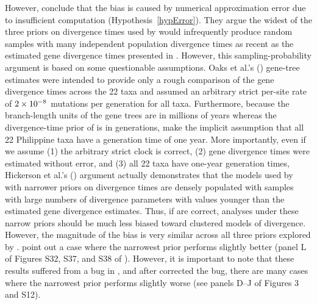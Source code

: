 However, \citet{Hickerson2013} conclude that the bias is caused by numerical
approximation error due to insufficient computation
(Hypothesis~\ref{hypError}).
They argue the widest of the three priors on divergence times used by
\citet{Oaks2012} would infrequently produce random samples with many
independent population divergence times as recent as the estimated gene
divergence times presented in \citet{Oaks2012}.
However, this sampling-probability argument is based on some questionable
assumptions.
Oaks et al.'s (\citeyear{Oaks2012}) gene-tree estimates were intended to
provide only a rough comparison of the gene divergence times across the 22 taxa
and assumed an arbitrary strict per-site rate of $2\times 10^{-8}$ mutations per
generation for all taxa.
Furthermore, because the branch-length units of the gene trees are in millions
of years whereas the divergence-time prior of \msb is in generations,
\citet{Hickerson2013} make the implicit assumption that all 22 Philippine taxa
have a generation time of one year.
More importantly, even if we assume (1) the arbitrary strict clock is correct,
(2) gene divergence times were estimated without error, and (3) all 22 taxa
have one-year generation times, Hickerson et al.'s (\citeyear{Hickerson2013})
argument actually demonstrates that the models used by \citet{Oaks2012} with
narrower priors on divergence times are densely populated with samples with
large numbers of divergence parameters with values younger than the estimated
gene divergence estimates.
Thus, if \citet{Hickerson2013} are correct, analyses under these narrow priors
should be much less biased toward clustered models of divergence.
However, the magnitude of the bias is very similar across all three priors
explored by \citet{Oaks2012}.
\citet{Hickerson2013} point out a case where the narrowest prior performs
slightly better (panel L of Figures S32, S37, and S38 of \citet{Oaks2012}).
However, it is important to note that these results suffered from a bug in
\msb, and after \citet{Oaks2012} corrected the bug, there are many cases where
the narrowest prior performs slightly worse (see panels D--J of Figures 3 and
S12).



